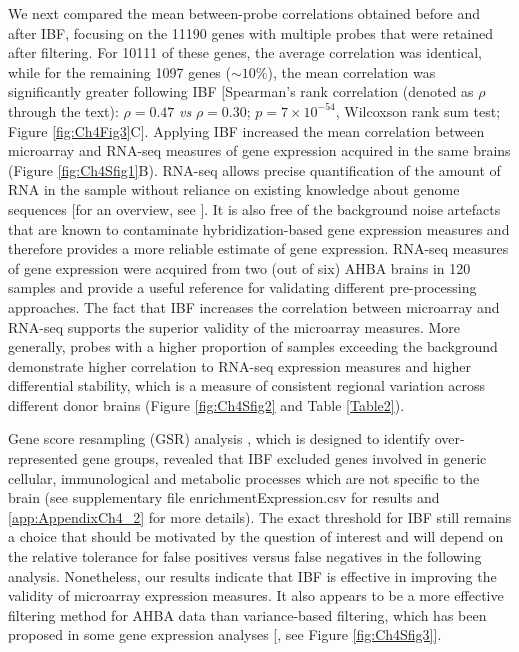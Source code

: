 We next compared the mean between-probe correlations obtained before and after IBF, focusing on the \num{11190} genes with multiple probes that were retained after filtering.
For \num{10111} of these genes, the average correlation was identical, while for the remaining \num{1097} genes ($\sim10\%$), the mean correlation was significantly greater following IBF [Spearman's rank correlation (denoted as $\rho$ through the text): $\rho = 0.47$ \textit{vs} $\rho = 0.30$; $p = 7 \times 10^{-54}$, Wilcoxson rank sum test; Figure \ref{fig:Ch4Fig3}C]. Applying IBF increased the mean correlation between microarray and RNA-seq measures of gene expression acquired in the same brains (Figure \ref{fig:Ch4Sfig1}B). RNA-seq allows precise quantification of the amount of RNA in the sample without reliance on existing knowledge about genome sequences [for an overview, see \citet{Wang2009,Kukurba2015}]. It is also free of the background noise artefacts that are known to contaminate hybridization-based gene expression measures and therefore provides a more reliable estimate of gene expression. RNA-seq measures of gene expression were acquired from two (out of six) AHBA brains in 120 samples and provide a useful reference for validating different pre-processing approaches. The fact that IBF increases the correlation between microarray and RNA-seq supports the superior validity of the microarray measures. More generally, probes with a higher proportion of samples exceeding the background demonstrate higher correlation to RNA-seq expression measures and higher differential stability, which is a measure of consistent regional variation across different donor brains (Figure \ref{fig:Ch4Sfig2} and Table \ref{Table2}).

Gene score resampling (GSR) analysis \citep{Gillis2010}, which is designed to identify over-represented gene groups, revealed that IBF excluded genes involved in generic cellular, immunological and metabolic processes which are not specific to the brain (see supplementary file enrichmentExpression.csv for results and \ref{app:AppendixCh4_2} for more details). The exact threshold for IBF still remains a choice that should be motivated by the question of interest and will depend on the relative tolerance for false positives versus false negatives in the following analysis. Nonetheless, our results indicate that IBF is effective in improving the validity of microarray expression measures. It also appears to be a more effective filtering method for AHBA data than variance-based filtering, which has been proposed in some gene expression analyses [\citep{Hackstadt2009}, see Figure \ref{fig:Ch4Sfig3}].

